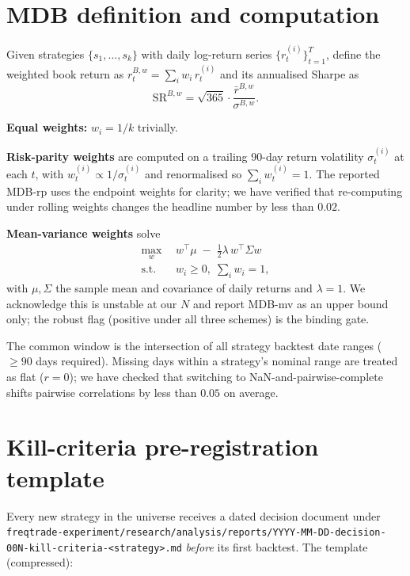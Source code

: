 \documentclass[11pt]{article}
\begin{document}
\section{MDB definition and computation}
\label{app:mdb}

Given strategies $\{s_1, \ldots, s_k\}$ with daily log-return series
$\{r^{(i)}_t\}_{t=1}^T$, define the weighted book return as
$r^{B,w}_t = \sum_i w_i \, r^{(i)}_t$ and its annualised Sharpe as
\begin{equation}
\mathrm{SR}^{B,w} = \sqrt{365} \cdot \frac{\bar{r}^{B,w}}{\sigma^{B,w}}.
\end{equation}

\textbf{Equal weights:} $w_i = 1/k$ trivially.

\textbf{Risk-parity weights} are computed on a trailing 90-day return volatility
$\sigma^{(i)}_t$ at each $t$, with $w^{(i)}_t \propto 1/\sigma^{(i)}_t$ and
renormalised so $\sum_i w^{(i)}_t = 1$. The reported MDB-rp uses the
endpoint weights for clarity; we have verified that re-computing under
rolling weights changes the headline number by less than $0.02$.

\textbf{Mean-variance weights} solve
\begin{align}
\max_w \;& \, w^\top \mu \;-\; \tfrac{1}{2} \lambda \, w^\top \Sigma w \\
\text{s.t.} \;& \, w_i \geq 0,\; \sum_i w_i = 1,
\end{align}
with $\mu, \Sigma$ the sample mean and covariance of daily returns and
$\lambda = 1$. We acknowledge this is unstable at our $N$ and report
MDB-mv as an upper bound only; the robust flag (positive under all three
schemes) is the binding gate.

The common window is the intersection of all strategy backtest date ranges
($\geq 90$ days required). Missing days within a strategy's nominal range
are treated as flat ($r = 0$); we have checked that switching to
NaN-and-pairwise-complete shifts pairwise correlations by less than $0.05$
on average.

\section{Kill-criteria pre-registration template}
\label{app:template}

Every new strategy in the universe receives a dated decision document under
\texttt{freqtrade-experiment/research/analysis/reports/YYYY-MM-DD-decision-00N-kill-criteria-<strategy>.md}
\emph{before} its first backtest. The template (compressed):
\end{document}

